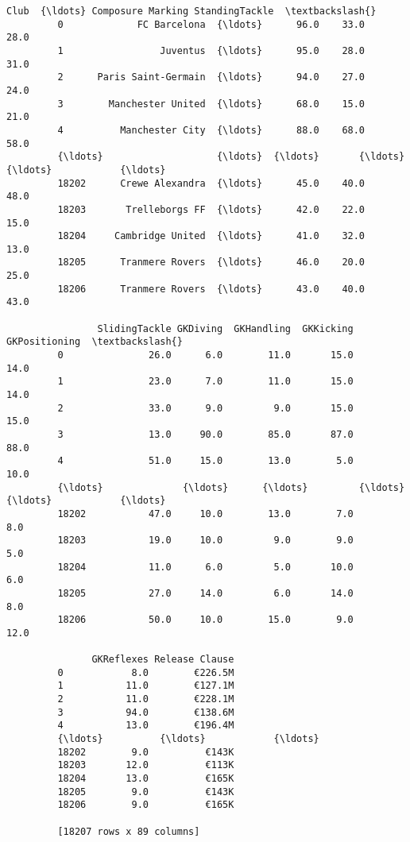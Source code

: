 \documentclass[11pt]{article}
\begin{document}
\begin{Verbatim}[commandchars=\\\{\}]
                               Club  {\ldots} Composure Marking StandingTackle  \textbackslash{}
         0             FC Barcelona  {\ldots}      96.0    33.0           28.0   
         1                 Juventus  {\ldots}      95.0    28.0           31.0   
         2      Paris Saint-Germain  {\ldots}      94.0    27.0           24.0   
         3        Manchester United  {\ldots}      68.0    15.0           21.0   
         4          Manchester City  {\ldots}      88.0    68.0           58.0   
         {\ldots}                    {\ldots}  {\ldots}       {\ldots}     {\ldots}            {\ldots}   
         18202      Crewe Alexandra  {\ldots}      45.0    40.0           48.0   
         18203       Trelleborgs FF  {\ldots}      42.0    22.0           15.0   
         18204     Cambridge United  {\ldots}      41.0    32.0           13.0   
         18205      Tranmere Rovers  {\ldots}      46.0    20.0           25.0   
         18206      Tranmere Rovers  {\ldots}      43.0    40.0           43.0   
         
                SlidingTackle GKDiving  GKHandling  GKKicking  GKPositioning  \textbackslash{}
         0               26.0      6.0        11.0       15.0           14.0   
         1               23.0      7.0        11.0       15.0           14.0   
         2               33.0      9.0         9.0       15.0           15.0   
         3               13.0     90.0        85.0       87.0           88.0   
         4               51.0     15.0        13.0        5.0           10.0   
         {\ldots}              {\ldots}      {\ldots}         {\ldots}        {\ldots}            {\ldots}   
         18202           47.0     10.0        13.0        7.0            8.0   
         18203           19.0     10.0         9.0        9.0            5.0   
         18204           11.0      6.0         5.0       10.0            6.0   
         18205           27.0     14.0         6.0       14.0            8.0   
         18206           50.0     10.0        15.0        9.0           12.0   
         
               GKReflexes Release Clause  
         0            8.0        €226.5M  
         1           11.0        €127.1M  
         2           11.0        €228.1M  
         3           94.0        €138.6M  
         4           13.0        €196.4M  
         {\ldots}          {\ldots}            {\ldots}  
         18202        9.0          €143K  
         18203       12.0          €113K  
         18204       13.0          €165K  
         18205        9.0          €143K  
         18206        9.0          €165K  
         
         [18207 rows x 89 columns]
\end{Verbatim}
            
\end{document}

